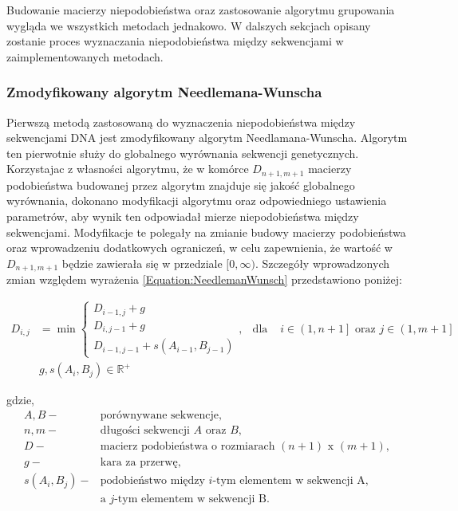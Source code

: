         Budowanie macierzy niepodobieństwa oraz zastosowanie algorytmu grupowania wygląda we wszystkich metodach jednakowo. W dalszych sekcjach opisany zostanie proces wyznaczania niepodobieństwa między sekwencjami w zaimplementowanych metodach.
        
        \subsubsection{Zmodyfikowany algorytm Needlemana-Wunscha}
            \label{Method:NeedlemaWunsch}

            Pierwszą metodą zastosowaną do wyznaczenia niepodobieństwa między sekwencjami DNA jest  zmodyfikowany algorytm Needlamana-Wunscha. Algorytm ten pierwotnie służy do globalnego wyrównania sekwencji genetycznych. Korzystajac z własności algorytmu, że w komórce $D_{n+1, m+1}$ macierzy podobieństwa budowanej przez algorytm znajduje się jakość globalnego wyrównania, dokonano modyfikacji algorytmu oraz odpowiedniego ustawienia parametrów, aby wynik ten odpowiadał mierze niepodobieństwa między sekwencjami. Modyfikacje te polegały na zmianie budowy macierzy podobieństwa oraz wprowadzeniu dodatkowych ograniczeń, w celu zapewnienia, że wartość w $D_{n+1, m+1}$ będzie zawierała się w przedziale $[0, \infty)$. Szczegóły wprowadzonych zmian względem wyrażenia \eqref{Equation:NeedlemanWunsch} przedstawiono poniżej:

            \begin{equation}
                \begin{aligned}
                    D_{i,j} &= \min
                    \begin{cases}
                    D_{i - 1, j} + g \\
                    D_{i, j - 1} + g \\
                    D_{i - 1, j - 1} + s(A_{i - 1}, B_{j - 1})
                    \end{cases}, & \text{dla } & i \in \left(1, n + 1\right] \text{ oraz } j \in \left(1, m + 1\right] \\
                    & g, s(A_i, B_j) \in \mathbb{R}^{+}
                \end{aligned}
            \end{equation}

            gdzie,
            \begin{align*} 
                A, B -& \text{porównywane sekwencje}, \\
                n, m -& \text{długości sekwencji } A \text{ oraz } B, \\
                D -& \text{macierz podobieństwa o rozmiarach } (n + 1) \text{ x } (m + 1), \\
                g -& \text{kara za przerwę}, \\
                s(A_i, B_j) -& \text{podobieństwo między  } i\text{-tym elementem w sekwencji A,} \\ 
                & \text{a } j \text{-tym elementem w sekwencji B}. \\
            \end{align*}

